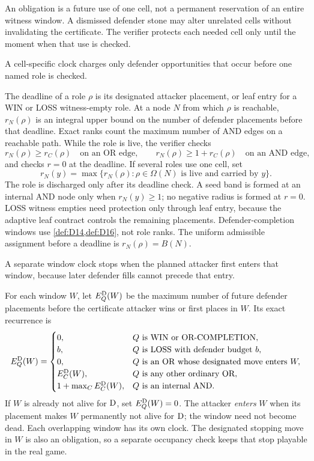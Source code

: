 \begin{plainterms}
An obligation is a future use of one cell, not a permanent reservation of an
entire witness window.  A dismissed defender stone may alter unrelated cells
without invalidating the certificate.  The verifier protects each needed
cell only until the moment when that use is checked.
\end{plainterms}

A cell-specific clock charges only defender opportunities that occur before
one named role is checked.

\begin{definition}
\label{def:D15}
The deadline of a role $\rho$ is its designated attacker placement, or leaf
entry for a WIN or LOSS witness-empty role.  At a node $N$ from which $\rho$
is reachable, $r_N(\rho)$ is an integral upper bound on the number of defender
placements before that deadline.  Exact ranks count the maximum number of AND
edges on a reachable path.  While the role is live, the verifier checks
\[
 r_N(\rho)\ge r_C(\rho)\quad\text{on an OR edge},
 \qquad
 r_N(\rho)\ge1+r_C(\rho)\quad\text{on an AND edge},
\]
and checks $r=0$ at the deadline.  If several roles use one cell, set
\[
  r_N(y)=\max\{r_N(\rho):\rho\in\Omega(N)
                       \text{ is live and carried by }y\}.
\]
The role is discharged only after its deadline check.  A seed band is formed
at an internal AND node only when $r_N(y)\ge1$; no negative radius is formed
at $r=0$.  LOSS witness empties need protection only through leaf entry,
because the adaptive leaf contract controls the remaining placements.
Defender-completion windows use \cref{def:D14,def:D16}, not role ranks.  The
uniform admissible assignment before a deadline is $r_N(\rho)=B(N)$.
\end{definition}

A separate window clock stops when the planned attacker first enters that
window, because later defender fills cannot precede that entry.

\begin{definition}
\label{def:D16}
For each window $W$, let $E_Q^{\mathrm{D}}(W)$ be the maximum number of future defender
placements before the certificate attacker wins or first places in $W$.  Its
exact recurrence is
\[
E_Q^{\mathrm{D}}(W)=
\begin{cases}
0,&Q\text{ is WIN or OR-COMPLETION},\\
b,&Q\text{ is LOSS with defender budget }b,\\
0,&Q\text{ is an OR whose designated move enters }W,\\
E_C^{\mathrm{D}}(W),&Q\text{ is any other ordinary OR},\\
1+\max_C E_C^{\mathrm{D}}(W),&Q\text{ is an internal AND}.
\end{cases}
\]
If $W$ is already not alive for $\mathrm{D}$, set $E_Q^{\mathrm{D}}(W)=0$.  The attacker
\emph{enters} $W$ when its placement makes $W$ permanently not alive for
$\mathrm{D}$; the window need not become dead.  Each overlapping window has its own
clock.  The designated stopping move in $W$ is also an obligation, so a
separate occupancy check keeps that stop playable in the real game.
\end{definition}

